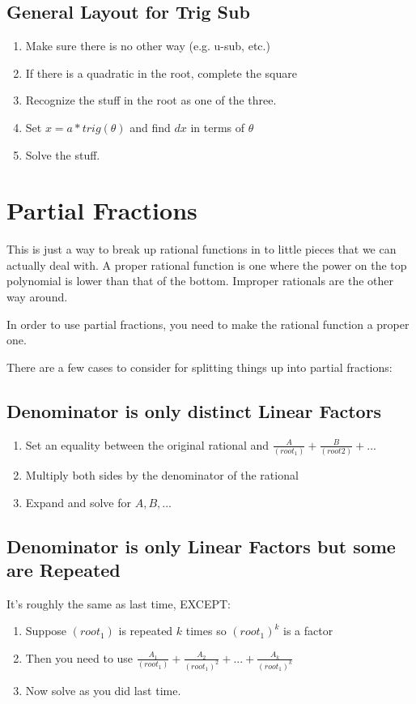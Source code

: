 \documentclass[a4paper,12pt]{report}
\begin{document}
\subsection{General Layout for Trig Sub}
\begin{enumerate}
\item Make sure there is no other way (e.g. u-sub, etc.)
\item If there is a quadratic in the root, complete the square
\item Recognize the stuff in the root as one of the three.
\item Set $x = a*trig(\theta)$ and find $dx$ in terms of $\theta$
\item Solve the stuff.

\end{enumerate}

\section{Partial Fractions}
This is just a way to break up rational functions in to little pieces that we can actually deal with.
A proper rational function is one where the power on the top polynomial is lower than that of the bottom. Improper rationals are the other way around.

In order to use partial fractions, you need to make the rational function a proper one.

There are a few cases to consider for splitting things up into partial fractions:

\subsection{Denominator is only distinct Linear Factors}
\begin{enumerate}
\item Set an equality between the original rational and $\frac{A}{(root_1)} + \frac{B}{(root2)} + ...$
\item Multiply both sides by the denominator of the rational
\item Expand and solve for $A, B, ...$
\end{enumerate}

\subsection{Denominator is only Linear Factors but some are Repeated}
It's roughly the same as last time, EXCEPT:
\begin{enumerate}
\item Suppose $(root_1)$ is repeated $k$ times so $(root_1)^k$ is a factor
\item Then you need to use $\frac{A_1}{(root_1)} + \frac{A_2}{(root_1)^2} + ... + \frac{A_k}{(root_1)^k}$
\item Now solve as you did last time.
\end{enumerate}
\end{document}
